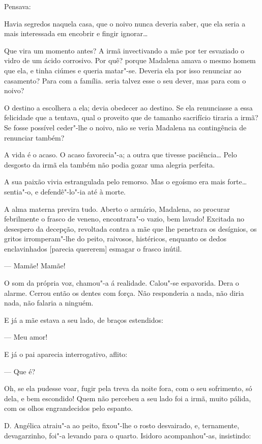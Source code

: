 Pensava:

Havia segredos naquela casa, que o noivo nunca deveria saber, que ela
seria a mais interessada em encobrir e fingir ignorar\ldots{}

Que vira um momento antes? A irmã invectivando a mãe por ter esvaziado o
vidro de um ácido corrosivo. Por quê? porque Madalena amava o mesmo
homem que ela, e tinha ciúmes e queria matar"-se. Deveria ela por isso
renunciar ao casamento? Para com a família. seria talvez esse o seu
dever, mas para com o noivo?

O destino a escolhera a ela; devia obedecer ao destino. Se ela
renunciasse a essa felicidade que a tentava, qual o proveito que de
tamanho sacrifício tiraria a irmã? Se fosse possível ceder"-lhe o noivo,
não se veria Madalena na contingência de renunciar também?

A vida é o acaso. O acaso favorecia"-a; a outra que tivesse paciência\ldots{}
Pelo desgosto da irmã ela também não podia gozar uma alegria perfeita.

A sua paixão vivia estrangulada pelo remorso. Mas o egoísmo era mais
forte\ldots{} sentia"-o, e defendê"-lo"-ia até à morte.

A alma materna previra tudo. Aberto o armário, Madalena, ao procurar
febrilmente o frasco de veneno, encontrara"-o vazio, bem lavado! Excitada
no desespero da decepção, revoltada contra a mãe que lhe penetrara os
desígnios, os gritos irromperam"-lhe do peito, raivosos, histéricos,
enquanto os dedos enclavinhados {[}parecia quererem{]} esmagar o frasco
inútil.

--- Mamãe! Mamãe!

O som da própria voz, chamou"-a á realidade. Calou"-se espavorida. Dera o
alarme. Cerrou então os dentes com força. Não responderia a nada, não
diria nada, não falaria a ninguém.

E já a mãe estava a seu lado, de braços estendidos:

--- Meu amor!

E já o pai aparecia interrogativo, aflito:

--- Que é?

Oh, se ela pudesse voar, fugir pela treva da noite fora, com o seu
sofrimento, só dela, e bem escondido! Quem não percebeu a seu lado foi a
irmã, muito pálida, com os olhos engrandecidos pelo espanto.

D. Angélica atraiu"-a ao peito, fixou"-lhe o rosto desvairado, e,
ternamente, devagarzinho, foi"-a levando para o quarto. Isidoro
acompanhou"-as, insistindo:

